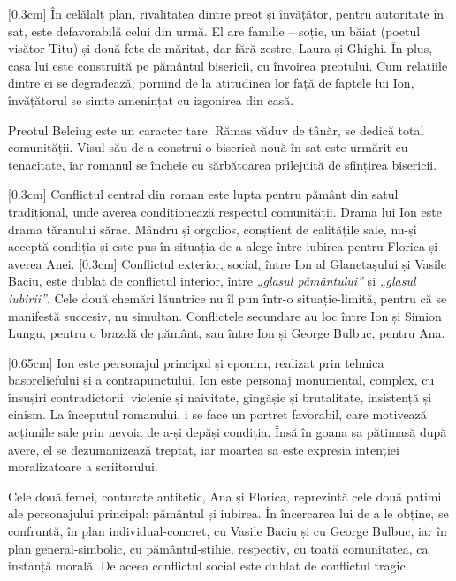 [0.3cm]
În celălalt plan, rivalitatea dintre preot și învățător, pentru autoritate în sat, este defavorabilă celui din urmă. El are familie -- soție, un băiat (poetul visător Titu) și două fete de măritat, dar fără zestre, Laura și Ghighi. În plus, casa lui este construită pe pământul bisericii, cu învoirea preotului. Cum relațiile dintre ei se degradează, pornind de la atitudinea lor față de faptele lui Ion, învățătorul se simte amenințat cu izgonirea din casă.

Preotul Belciug este un caracter tare. Rămas văduv de tânăr, se dedică total comunității. Visul său de a construi o biserică nouă în sat este urmărit cu tenacitate, iar romanul se încheie cu sărbătoarea prilejuită de sfințirea bisericii.

[0.3cm]
Conflictul central din roman este lupta pentru pământ din satul tradițional, unde averea condiționează respectul comunității. Drama lui Ion este drama țăranului sărac. Mândru și orgolios, conștient de calitățile sale, nu-și acceptă condiția și este pus în situația de a alege între iubirea pentru Florica și averea Anei.
[0.3cm]
Conflictul exterior, social, între Ion al Glanetașului și Vasile Baciu, este dublat de conflictul interior, între \textit{„glasul pământului”} și \textit{„glasul iubirii”}. Cele două chemări lăuntrice nu îl pun într-o situație-limită, pentru că se manifestă succesiv, nu simultan. Conflictele secundare au loc între Ion și Simion Lungu, pentru o brazdă de pământ, sau între Ion și George Bulbuc, pentru Ana.

[0.65cm]
Ion este personajul principal și eponim, realizat prin tehnica basoreliefului și a contrapunctului. Ion este personaj monumental, complex, cu însușiri contradictorii: viclenie și naivitate, gingășie și brutalitate, insistență și cinism. La începutul romanului, i se face un portret favorabil, care motivează acțiunile sale prin nevoia de a-și depăși condiția. Însă în goana sa pătimașă după avere, el se dezumanizează treptat, iar moartea sa este expresia intenției moralizatoare a scriitorului.

Cele două femei, conturate antitetic, Ana și Florica, reprezintă cele două patimi ale personajului principal: pământul și  iubirea. În încercarea lui de a le obține, se confruntă, în plan individual-concret, cu Vasile Baciu și cu George Bulbuc, iar în plan general-simbolic, cu pământul-stihie, respectiv, cu toată comunitatea, ca instanță morală. De aceea conflictul social este dublat de conflictul tragic.

